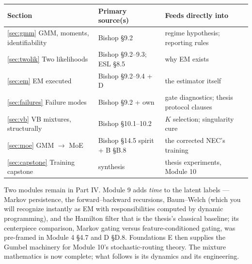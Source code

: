 \documentclass[11pt]{article}
\numberwithin{equation}{section}
\theoremstyle{plain}
\theoremstyle{definition}
\theoremstyle{remark}
\begin{document}
\begin{center}
\small
\begin{tabular}{@{}lll@{}}
\toprule
Section & Primary source(s) & Feeds directly into \\
\midrule
\ref{sec:gmm} GMM, moments, identifiability & Bishop \S9.2 & regime hypothesis; reporting rules \\
\ref{sec:twolik} Two likelihoods & Bishop \S9.2--9.3; ESL \S8.5 & why EM exists \\
\ref{sec:em} EM executed & Bishop \S9.2--9.4 + D & the estimator itself \\
\ref{sec:failures} Failure modes & Bishop \S9.2 + own & gate diagnostics; thesis protocol clauses \\
\ref{sec:vb} VB mixtures, structurally & Bishop \S10.1--10.2 & $K$ selection; singularity cure \\
\ref{sec:moe} GMM $\to$ MoE & Bishop \S14.5 spirit + B \S B.8 & the corrected NEC's training \\
\ref{sec:capstone} Training capstone & synthesis & thesis experiments, Module 10 \\
\bottomrule
\end{tabular}
\end{center}

\medskip
Two modules remain in Part IV. Module 9 adds \emph{time} to the latent labels --- Markov persistence, the forward--backward recursions, Baum--Welch (which you will recognize instantly as EM with responsibilities computed by dynamic programming), and the Hamilton filter that is the thesis's classical baseline; its centerpiece comparison, Markov gating versus feature-conditioned gating, was pre-framed in Module 4 \S4.7 and D \S D.8. Foundations E then supplies the Gumbel machinery for Module 10's stochastic-routing theory. The mixture mathematics is now complete; what follows is its dynamics and its engineering.
\end{document}
